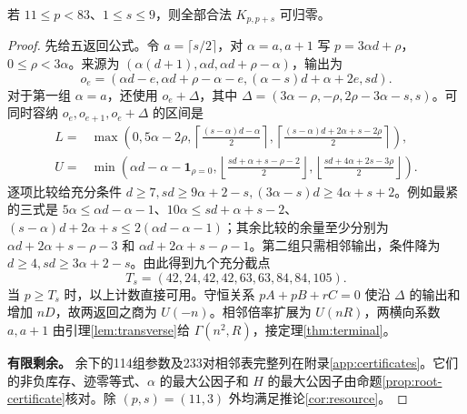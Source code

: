 \begin{lemma}[九个低偏移的有限补充]\label{lem:small-supply}
若 $11\le p<83$、$1\le s\le9$，则全部合法 $K_{p,p+s}$ 可归零。
\end{lemma}
\begin{proof}
先给五返回公式。令 $a=\lceil s/2\rceil$，对 $\alpha=a,a+1$ 写 $p=3\alpha d+\rho$，$0\le\rho<3\alpha$。来源为 $(\alpha(d+1),\alpha d,\alpha d+\rho-\alpha)$，输出为
\[
o_e=(\alpha d-e,\alpha d+\rho-\alpha-e,(\alpha-s)d+\alpha+2e,sd).
\]
对于第一组 $\alpha=a$，还使用 $o_e+\Delta$，其中 $\Delta=(3\alpha-\rho,-\rho,2\rho-3\alpha-s,s)$。可同时容纳 $o_e,o_{e+1},o_e+\Delta$ 的区间是
\begin{align*}
L={}&\max\left(0,5\alpha-2\rho,
\left\lceil\frac{(s-\alpha)d-\alpha}{2}\right\rceil,
\left\lceil\frac{(s-\alpha)d+2\alpha+s-2\rho}{2}\right\rceil\right),\\
U={}&\min\left(\alpha d-\alpha-\mathbf1_{\rho=0},
\left\lfloor\frac{sd+\alpha+s-\rho-2}{2}\right\rfloor,
\left\lfloor\frac{sd+4\alpha+2s-3\rho}{2}\right\rfloor\right).
\end{align*}
逐项比较给充分条件 $d\ge7,sd\ge9\alpha+2-s,(3\alpha-s)d\ge4\alpha+s+2$。例如最紧的三式是 $5\alpha\le\alpha d-\alpha-1$、$10\alpha\le sd+\alpha+s-2$、$(s-\alpha)d+2\alpha+s\le2(\alpha d-\alpha-1)$；其余比较的余量至少分别为 $\alpha d+2\alpha+s-\rho-3$ 和 $\alpha d+2\alpha+s-\rho-1$。第二组只需相邻输出，条件降为 $d\ge4,sd\ge3\alpha+2-s$。由此得到九个充分截点
\[
T_s=(42,24,42,42,63,63,84,84,105).
\]
当 $p\ge T_s$ 时，以上计数直接可用。守恒关系 $pA+pB+rC=0$ 使沿 $\Delta$ 的输出和增加 $nD$，故两返回之商为 $U(-n)$。相邻倍率扩展为 $U(nR)$，两横向系数 $a,a+1$ 由引理\ref{lem:transverse}给 $\Gamma(n^2,R)$，接定理\ref{thm:terminal}。


\par\noindent\textbf{有限剩余。}
余下的114组参数及233对相邻表完整列在附录\ref{app:certificates}。它们的非负库存、迹零等式、$\alpha$ 的最大公因子和 $H$ 的最大公因子由命题\ref{prop:root-certificate}核对。除 $(p,s)=(11,3)$ 外均满足推论\ref{cor:resource}。


\end{proof}
